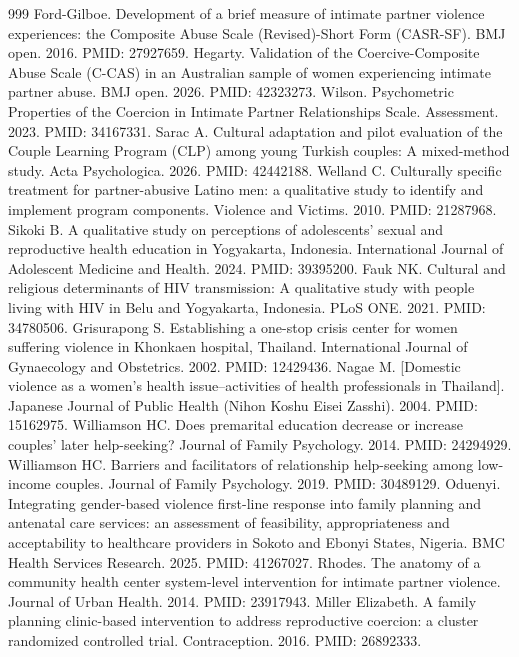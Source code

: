 \begin{thebibliography}{999}
 Ford-Gilboe. Development of a brief measure of intimate partner violence experiences: the Composite Abuse Scale (Revised)-Short Form (CASR-SF). BMJ open. 2016. PMID: 27927659.
 Hegarty. Validation of the Coercive-Composite Abuse Scale (C-CAS) in an Australian sample of women experiencing intimate partner abuse. BMJ open. 2026. PMID: 42323273.
 Wilson. Psychometric Properties of the Coercion in Intimate Partner Relationships Scale. Assessment. 2023. PMID: 34167331.
 Sarac A. Cultural adaptation and pilot evaluation of the Couple Learning Program (CLP) among young Turkish couples: A mixed-method study. Acta Psychologica. 2026. PMID: 42442188.
 Welland C. Culturally specific treatment for partner-abusive Latino men: a qualitative study to identify and implement program components. Violence and Victims. 2010. PMID: 21287968.
 Sikoki B. A qualitative study on perceptions of adolescents' sexual and reproductive health education in Yogyakarta, Indonesia. International Journal of Adolescent Medicine and Health. 2024. PMID: 39395200.
 Fauk NK. Cultural and religious determinants of HIV transmission: A qualitative study with people living with HIV in Belu and Yogyakarta, Indonesia. PLoS ONE. 2021. PMID: 34780506.
 Grisurapong S. Establishing a one-stop crisis center for women suffering violence in Khonkaen hospital, Thailand. International Journal of Gynaecology and Obstetrics. 2002. PMID: 12429436.
 Nagae M. [Domestic violence as a women's health issue--activities of health professionals in Thailand]. Japanese Journal of Public Health (Nihon Koshu Eisei Zasshi). 2004. PMID: 15162975.
 Williamson HC. Does premarital education decrease or increase couples' later help-seeking? Journal of Family Psychology. 2014. PMID: 24294929.
 Williamson HC. Barriers and facilitators of relationship help-seeking among low-income couples. Journal of Family Psychology. 2019. PMID: 30489129.
 Oduenyi. Integrating gender-based violence first-line response into family planning and antenatal care services: an assessment of feasibility, appropriateness and acceptability to healthcare providers in Sokoto and Ebonyi States, Nigeria. BMC Health Services Research. 2025. PMID: 41267027.
 Rhodes. The anatomy of a community health center system-level intervention for intimate partner violence. Journal of Urban Health. 2014. PMID: 23917943.
 Miller Elizabeth. A family planning clinic-based intervention to address reproductive coercion: a cluster randomized controlled trial. Contraception. 2016. PMID: 26892333.

\end{thebibliography}
